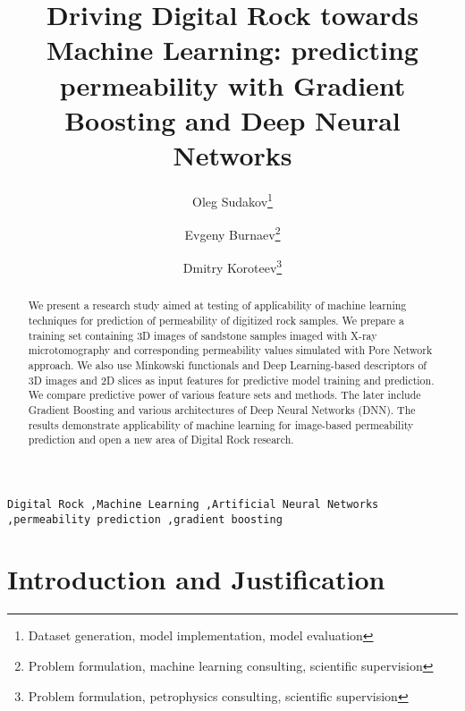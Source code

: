 \documentclass[review]{elsarticle}
\begin{document}
\begin{frontmatter}

\title{Driving Digital Rock towards Machine Learning: predicting permeability with Gradient Boosting and Deep Neural Networks}

\author[addressa]{Oleg Sudakov\footnote{Dataset generation, model implementation, model evaluation}}
\author[addressb]{Evgeny Burnaev\footnote{Problem formulation, machine learning consulting, scientific supervision}}
\author[addressc]{Dmitry Koroteev\footnote{Problem formulation, petrophysics consulting, scientific supervision}}

\address[addressa]{Skolkovo Institute of Science and Technology, Skolkovo Innovation Center, Building 3, Moscow, 143026, Russia, oleg.sudakov@skolkovotech.ru}
\address[addressb]{Skolkovo Institute of Science and Technology, Skolkovo Innovation Center, Building 3, Moscow, 143026, Russia, e.burnaev@skoltech.ru}
\address[addressc]{Skolkovo Institute of Science and Technology, Skolkovo Innovation Center, Building 3, Moscow, 143026, Russia, d.koroteev@skoltech.ru}

\begin{abstract}
We present a research study aimed at testing of applicability of machine learning techniques for prediction of permeability of digitized rock samples. We prepare a training set containing 3D images of sandstone samples imaged with X-ray microtomography and corresponding permeability values simulated with Pore Network approach. We also use Minkowski functionals and Deep Learning-based descriptors of 3D images and 2D slices as input features for predictive model training and prediction. We compare predictive power of various feature sets and methods. The later include 
Gradient Boosting and various architectures of Deep Neural Networks (DNN). The results demonstrate applicability of machine learning for image-based permeability prediction and open a new area of Digital Rock research.  

\end{abstract}

\begin{keyword}
\texttt{Digital Rock \sep Machine Learning \sep Artificial Neural Networks \sep permeability prediction \sep gradient boosting}
\end{keyword}

\end{frontmatter}

\section{Introduction and Justification}
\end{document}
